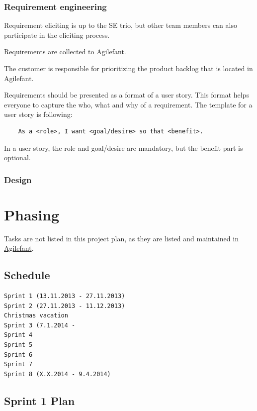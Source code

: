 \subsubsection{Requirement engineering}

Requirement eliciting is up to the SE trio, but other team members can also 
participate in the eliciting process.

Requirements are collected to Agilefant. 

The customer is responsible for prioritizing the product backlog that is located 
in Agilefant.

Requirements should be presented as a format of a user story. This format helps 
everyone to capture the who, what and why of a requirement. The template for a 
user story is following:

\begin{verbatim}
    As a <role>, I want <goal/desire> so that <benefit>.
\end{verbatim}

In a user story, the role and goal/desire are mandatory, but the benefit part is 
optional.

\subsubsection{Design}



\section{Phasing}

Tasks are not listed in this project plan, as they are listed and maintained in 
\href{https://cloud.agilefant.com/dev/}{Agilefant}.

\subsection{Schedule}

\begin{verbatim}
Sprint 1 (13.11.2013 - 27.11.2013)
Sprint 2 (27.11.2013 - 11.12.2013)
Christmas vacation
Sprint 3 (7.1.2014 - 
Sprint 4
Sprint 5
Sprint 6
Sprint 7
Sprint 8 (X.X.2014 - 9.4.2014) 
\end{verbatim}

\subsection{Sprint 1 Plan}

